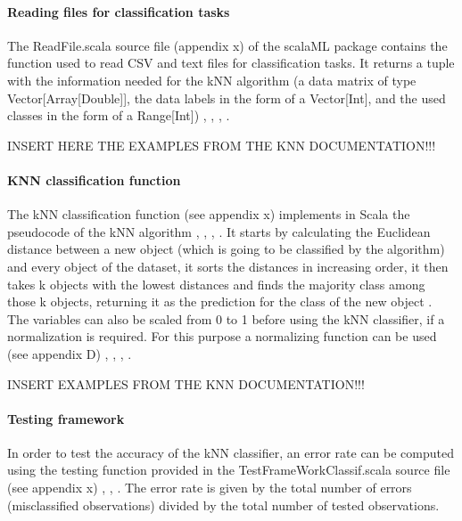 \documentclass {article}
\begin{document}
\paragraph {Reading files for classification tasks}

The ReadFile.scala source file (appendix x) of the scalaML package contains the function used to read CSV and text files for classification tasks. It returns a tuple with the information needed for the kNN algorithm (a data matrix of type Vector[Array[Double]], the data labels in the form of a Vector[Int],  and the used classes in the form of a Range[Int]) \cite{harrington_machine_2012}, \cite{odersky_programming_2010}, \cite{swartz_learning_2015}, \cite{epfl_scala_2017}.
 
INSERT HERE THE EXAMPLES FROM THE KNN DOCUMENTATION!!!

\paragraph {KNN classification function}

The kNN classification function (see appendix x) implements in Scala the pseudocode of the kNN algorithm \cite{harrington_machine_2012}, \cite{odersky_programming_2010}, \cite{swartz_learning_2015}, \cite{epfl_scala_2017}. 
It starts by calculating the Euclidean distance between a new object (which is going to be classified by the algorithm) and every object of the dataset, it sorts the distances in increasing order, it then takes k objects with the lowest distances and finds the majority class among those k objects, returning it as the prediction for the class of the new object \cite{harrington_machine_2012}.
The variables can also be scaled from 0 to 1 before using the kNN classifier, if a normalization is required. For this purpose a normalizing function can be used (see appendix D) \cite{quinn_experimental_2002}, \cite{harrington_machine_2012}, \cite{odersky_programming_2010}, \cite{epfl_scala_2017}. 

INSERT EXAMPLES FROM THE KNN DOCUMENTATION!!! 

\paragraph{Testing framework}    

In order to test the accuracy of the kNN classifier, an error rate can be computed using the testing function provided in the TestFrameWorkClassif.scala source file (see appendix x) \cite{harrington_machine_2012}, \cite{odersky_programming_2010}, \cite{epfl_scala_2017}.
 The error rate is given by the total number of errors (misclassified observations) divided by the total number of tested observations. 
\end{document}
